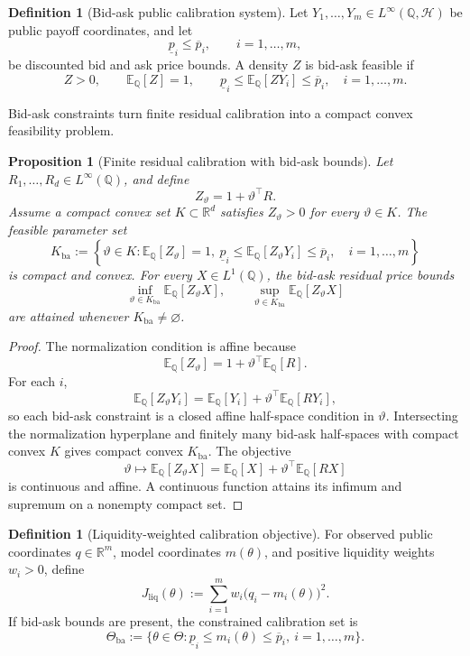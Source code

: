 \documentclass[11pt,a4paper]{amsart}
\theoremstyle{plain}
\newtheorem{proposition}[theorem]{Proposition}
\theoremstyle{definition}
\newtheorem{definition}[theorem]{Definition}
\theoremstyle{remark}
\newcommand{\R}{\mathbb{R}}
\newcommand{\QQ}{\mathbb{Q}}
\newcommand{\EE}{\mathbb{E}}
\newcommand{\cH}{\mathcal{H}}
\begin{document}
\begin{definition}[Bid-ask public calibration system]\label{def:bidask-system}
Let \(Y_1,\ldots,Y_m\in L^\infty(\QQ,\cH)\) be public payoff coordinates, and let
\[
        \underline p_i\le \overline p_i,
        \qquad i=1,\ldots,m,
\]
be discounted bid and ask price bounds.  A density \(Z\) is bid-ask feasible if
\[
        Z>0,\qquad
        \EE_\QQ[Z]=1,
        \qquad
        \underline p_i\le \EE_\QQ[ZY_i]\le\overline p_i,
        \quad i=1,\ldots,m.
\]
\end{definition}

Bid-ask constraints turn finite residual calibration into a compact convex feasibility problem.

\begin{proposition}[Finite residual calibration with bid-ask bounds]\label{prop:bidask-polytope}
Let \(R_1,\ldots,R_d\in L^\infty(\QQ)\), and define
\[
        Z_\vartheta=1+\vartheta^\top R.
\]
Assume a compact convex set \(K\subset\R^d\) satisfies \(Z_\vartheta>0\) for every
\(\vartheta\in K\).  The feasible parameter set
\[
        K_{\mathrm{ba}}
        :=
        \left\{
        \vartheta\in K:
        \EE_\QQ[Z_\vartheta]=1,\ 
        \underline p_i\le \EE_\QQ[Z_\vartheta Y_i]\le\overline p_i,\quad i=1,\ldots,m
        \right\}
\]
is compact and convex.  For every \(X\in L^1(\QQ)\), the bid-ask residual price bounds
\[
        \inf_{\vartheta\in K_{\mathrm{ba}}}\EE_\QQ[Z_\vartheta X],
        \qquad
        \sup_{\vartheta\in K_{\mathrm{ba}}}\EE_\QQ[Z_\vartheta X]
\]
are attained whenever \(K_{\mathrm{ba}}\ne\varnothing\).
\end{proposition}

\begin{proof}
The normalization condition is affine because
\[
        \EE_\QQ[Z_\vartheta]
        =
        1+\vartheta^\top\EE_\QQ[R].
\]
For each \(i\),
\[
        \EE_\QQ[Z_\vartheta Y_i]
        =
        \EE_\QQ[Y_i]+\vartheta^\top \EE_\QQ[RY_i],
\]
so each bid-ask constraint is a closed affine half-space condition in \(\vartheta\).  Intersecting
the normalization hyperplane and finitely many bid-ask half-spaces with compact convex \(K\) gives
compact convex
\(K_{\mathrm{ba}}\).  The objective
\[
        \vartheta\mapsto \EE_\QQ[Z_\vartheta X]
        =
        \EE_\QQ[X]+\vartheta^\top\EE_\QQ[RX]
\]
is continuous and affine.  A continuous function attains its infimum and supremum on a nonempty
compact set.
\end{proof}

\begin{definition}[Liquidity-weighted calibration objective]\label{def:liquidity-objective}
For observed public coordinates \(q\in\R^m\), model coordinates \(m(\theta)\), and positive
liquidity weights \(w_i>0\), define
\[
        J_{\mathrm{liq}}(\theta)
        :=
        \sum_{i=1}^m w_i\bigl(q_i-m_i(\theta)\bigr)^2.
\]
If bid-ask bounds are present, the constrained calibration set is
\[
        \Theta_{\mathrm{ba}}
        :=
        \{\theta\in\Theta:\underline p_i\le m_i(\theta)\le\overline p_i,\ i=1,\ldots,m\}.
\]
\end{definition}
\end{document}
